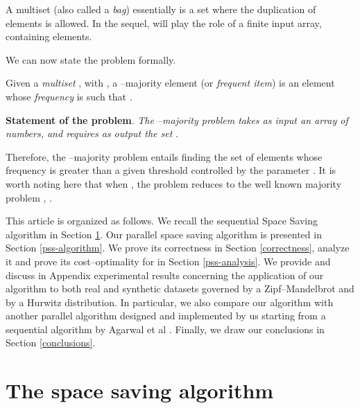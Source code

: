 \documentclass[final,3p,times]{elsarticle}
\begin{document}
\noindent A multiset (also called a \emph{bag}) essentially is a set where the duplication of elements is allowed. In the sequel,  will play the role of a finite
input array, containing  elements.

We can now state the problem formally.

\begin{defn}
\label{def2}
Given a \emph{multiset} , with , a --majority element (or \emph{frequent item}) is an element  whose \emph{frequency}  is such
that  .
\end{defn}

\textbf{Statement of the problem}. \textit{The --majority problem takes as input an array  of  numbers, and requires as output the set }.

Therefore, the --majority problem entails finding the set of elements whose frequency is greater than a given threshold controlled by the parameter . It is worth noting here that when , the problem reduces to the well known majority problem \cite{Moore81}, \cite{Fischer82}.

This article is organized as follows. We recall the sequential Space Saving algorithm in Section \ref{spacesaving}. Our parallel space saving algorithm is presented in Section \ref{pss-algorithm}. We prove its correctness in Section \ref{correctness},
analyze it and prove its cost--optimality for  in Section \ref{pss-analysis}. We provide and discuss in Appendix experimental results concerning the application of our algorithm to both real and synthetic datasets governed by a Zipf--Mandelbrot and by a Hurwitz distribution. In particular, we also compare our algorithm with another parallel algorithm designed and implemented by us starting from a sequential algorithm by Agarwal et al \cite{Agarwal}. Finally, we draw our conclusions in Section \ref{conclusions}.

\section{The space saving algorithm}
\label{spacesaving}
\end{document}
